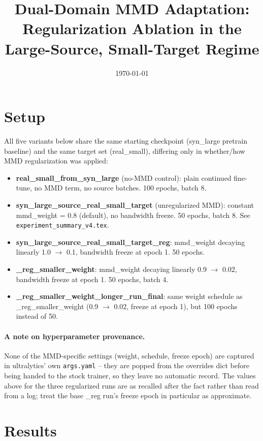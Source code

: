 \documentclass[11pt]{article}
\title{Dual-Domain MMD Adaptation: Regularization Ablation in the Large-Source,
Small-Target Regime}
\author{}
\date{\today}
\begin{document}
\maketitle

\section{Setup}

All five variants below share the same starting checkpoint (syn\_large pretrain
baseline) and the same target set (real\_small), differing only in whether/how MMD
regularization was applied:

\begin{itemize}
    \item \textbf{real\_small\_from\_syn\_large} (no-MMD control): plain continued
    fine-tune, no MMD term, no source batches. 100 epochs, batch 8.
    \item \textbf{syn\_large\_source\_real\_small\_target} (unregularized MMD):
    constant mmd\_weight = 0.8 (default), no bandwidth freeze. 50 epochs, batch 8. See
    \texttt{experiment\_summary\_v4.tex}.
    \item \textbf{syn\_large\_source\_real\_small\_target\_reg}: mmd\_weight decaying
    linearly 1.0 $\to$ 0.1, bandwidth freeze at epoch 1. 50 epochs.
    \item \textbf{\_reg\_smaller\_weight}: mmd\_weight decaying linearly 0.9 $\to$
    0.02, bandwidth freeze at epoch 1. 50 epochs, batch 4.
    \item \textbf{\_reg\_smaller\_weight\_longer\_run\_final}: same weight schedule as
    \_reg\_smaller\_weight (0.9 $\to$ 0.02, freeze at epoch 1), but 100 epochs instead
    of 50.
\end{itemize}

\paragraph{A note on hyperparameter provenance.} None of the MMD-specific settings
(weight, schedule, freeze epoch) are captured in ultralytics' own \texttt{args.yaml} --
they are popped from the overrides dict before being handed to the stock trainer, so
they leave no automatic record. The values above for the three regularized runs are
as recalled after the fact rather than read from a log; treat the base \_reg run's
freeze epoch in particular as approximate.

\section{Results}
\end{document}
